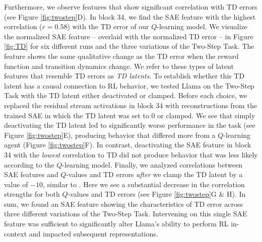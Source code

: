 \documentclass{article}
\begin{document}
Furthermore, we observe features that show significant correlation with TD errors (see Figure \ref{fig:twostep}D). In block 34, we find the SAE feature with the highest correlation ($r = 0.58$) with the TD error of our $Q$-learning model. We visualize the normalized SAE feature -- overlaid with the normalized TD error -- in Figure \ref{fig:TD} for six different runs and the three variations of the Two-Step Task. The feature shows the same qualitative change as the TD error when the reward function and transition dynamics change. We refer to these types of latent features that resemble TD errors as \emph{TD latents}. To establish whether this TD latent has a causal connection to RL behavior, we tested Llama on the Two-Step Task with the TD latent either deactivated or clamped. Before each choice, we replaced the residual stream activations in block 34 with reconstructions from the trained SAE in which the TD latent was set to 0 or clamped. We see that simply deactivating the TD latent led to significantly worse performance in the task (see Figure \ref{fig:twostep}E), producing behavior that differed more from a $Q$-learning agent (Figure \ref{fig:twostep}F). In contrast, deactivating the SAE feature in block 34 with the \emph{lowest} correlation to TD did not produce behavior that was less likely according to the $Q$-learning model. Finally, we analyzed correlations between SAE features and $Q$-values and TD errors \emph{after} we clamp the TD latent by a value of $-10$, similar to \cite{templeton2024scaling}. Here we see a substantial decrease in the correlation strengths for both $Q$-values and TD errors (see Figure \ref{fig:twostep}G \& H). In sum, we found an SAE feature showing the characteristics of TD error across three different variations of the Two-Step Task. Intervening on this single SAE feature was sufficient to significantly alter Llama's ability to perform RL in-context and impacted subsequent representations.
\end{document}
